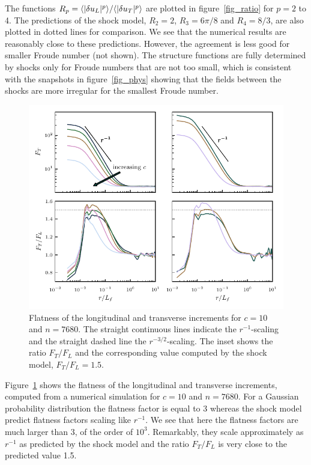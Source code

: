 The functions $R_p = \langle |\delta u_L|^p \rangle/\langle |\delta u_T|^p \rangle$ are
plotted in figure~\ref{fig_ratio} for $p =2$ to 4.  The predictions of
the shock model, $R_2 = 2$, $R_3 = 6\pi/8$ and $R_4 = 8/3$, are also
plotted in dotted lines for comparison.  We see that the numerical
results are reasonably close to these predictions.  However, the
agreement is less good for smaller Froude number (not shown).  The
structure functions are fully determined by shocks only for Froude
numbers that are not too small, which is consistent with the snapshots
in figure~\ref{fig_phys} showing that the fields between the shocks
are more irregular for the smallest Froude number.


\begin{figure}
\centerline{\includegraphics[width=5.12in]{../Pyfig/fig_flatness}}
\caption{ Flatness of the longitudinal and transverse increments for
$c = 10$ and $n = 7680$. The straight continuous lines indicate the
$r^{-1}$-scaling and the straight dashed line the $r^{-3/2}$-scaling.
The inset shows the ratio $F_T/F_L$ and the corresponding value
computed by the shock model, $F_T/F_L = 1.5$.  }
\label{fig_flatness}
\end{figure}
%
Figure~\ref{fig_flatness} shows the flatness of the longitudinal and
transverse increments, computed from a numerical simulation for $c =
10$ and $n = 7680$.
%
For a Gaussian probability distribution the flatness factor is equal
to 3 whereas the shock model predict flatness factors scaling like
$r^{-1}$.
%
We see that here the flatness factors are much larger than 3, of the
order of $10^3$.
%
Remarkably, they scale approximately as $r^{-1}$ as predicted by the
shock model and the ratio $F_T/F_L$ is very close to the predicted
value 1.5.



